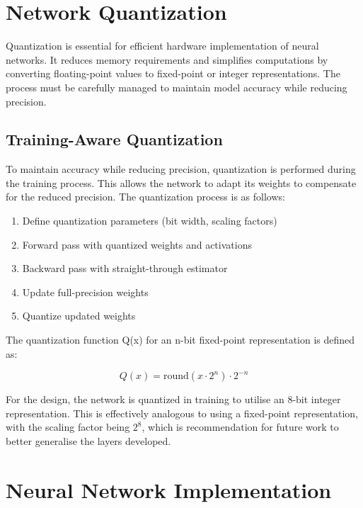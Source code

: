 \section{Network Quantization}
\label{sec:quantization}

Quantization is essential for efficient hardware implementation of neural networks.
It reduces memory requirements and simplifies computations by converting floating-point values to fixed-point or integer representations.
The process must be carefully managed to maintain model accuracy while reducing precision.

\subsection{Training-Aware Quantization}
\label{sec:training_quantization}

To maintain accuracy while reducing precision, quantization is performed during the training process.
This allows the network to adapt its weights to compensate for the reduced precision.
The quantization process is as follows:

\begin{enumerate}
    \item Define quantization parameters (bit width, scaling factors)
    \item Forward pass with quantized weights and activations
    \item Backward pass with straight-through estimator
    \item Update full-precision weights
    \item Quantize updated weights
\end{enumerate}

The quantization function Q(x) for an n-bit fixed-point representation is defined as:

\begin{equation}
    Q(x) = \text{round}(x \cdot 2^n) \cdot 2^{-n}
\end{equation}

For the design, the network is quantized in training to utilise an 8-bit integer representation.
This is effectively analogous to using a fixed-point representation, with the scaling factor being $2^8$, which is recommendation for future work to better generalise the layers developed.

\section{Neural Network Implementation}

